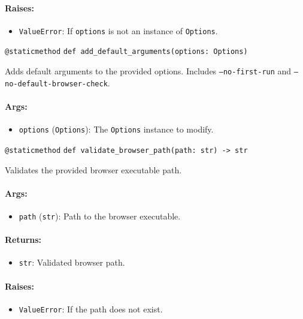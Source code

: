 \documentclass{article}
\begin{document}
\paragraph{Raises:}
\begin{itemize}
    \item \texttt{ValueError}: If \texttt{options} is not an instance of \texttt{Options}.
\end{itemize}

\noindent\texttt{@staticmethod}
\noindent\texttt{def add\_default\_arguments(options: Options)}

\noindent Adds default arguments to the provided options. Includes \texttt{--no-first-run} and \texttt{--no-default-browser-check}.

\paragraph{Args:}
\begin{itemize}
    \item \texttt{options} (\texttt{Options}): The \texttt{Options} instance to modify.
\end{itemize}

\noindent\texttt{@staticmethod}
\noindent\texttt{def validate\_browser\_path(path: str) -> str}

\noindent Validates the provided browser executable path.

\paragraph{Args:}
\begin{itemize}
    \item \texttt{path} (\texttt{str}): Path to the browser executable.
\end{itemize}

\paragraph{Returns:}
\begin{itemize}
    \item \texttt{str}: Validated browser path.
\end{itemize}

\paragraph{Raises:}
\begin{itemize}
    \item \texttt{ValueError}: If the path does not exist.
\end{itemize}
\end{document}
